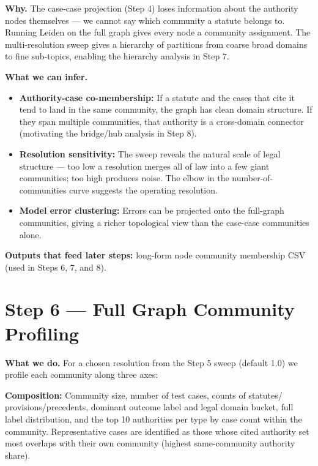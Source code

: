 \documentclass[11pt,a4paper]{article}
\begin{document}
\textbf{Why.}
The case-case projection (Step 4) loses information about the authority nodes
themselves --- we cannot say which community a statute belongs to. Running Leiden on
the full graph gives every node a community assignment. The multi-resolution sweep
gives a hierarchy of partitions from coarse broad domains to fine sub-topics, enabling
the hierarchy analysis in Step 7.

\textbf{What we can infer.}
\begin{itemize}
  \item \textbf{Authority-case co-membership:} If a statute and the cases that cite it
    tend to land in the same community, the graph has clean domain structure. If they
    span multiple communities, that authority is a cross-domain connector (motivating
    the bridge/hub analysis in Step 8).
  \item \textbf{Resolution sensitivity:} The sweep reveals the natural scale of
    legal structure --- too low a resolution merges all of law into a few giant
    communities; too high produces noise. The elbow in the number-of-communities curve
    suggests the operating resolution.
  \item \textbf{Model error clustering:} Errors can be projected onto the full-graph
    communities, giving a richer topological view than the case-case communities
    alone.
\end{itemize}

\textbf{Outputs that feed later steps:} long-form node community membership CSV (used
in Steps 6, 7, and 8).

\bigskip

\section{Step 6 \texorpdfstring{\textcolor{stepgray}{---}}{---} Full Graph Community Profiling}

\textbf{What we do.}
For a chosen resolution from the Step 5 sweep (default 1.0) we profile each community
along three axes:

\textbf{Composition:} Community size, number of test cases, counts of statutes/
provisions/precedents, dominant outcome label and legal domain bucket, full label
distribution, and the top 10 authorities per type by case count within the community.
Representative cases are identified as those whose cited authority set most overlaps
with their own community (highest same-community authority share).
\end{document}
